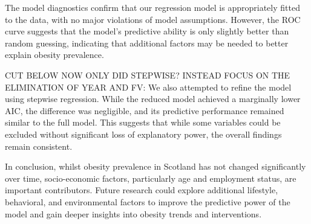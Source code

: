 \documentclass[
  letterpaper,
  DIV=11,
  numbers=noendperiod]{scrartcl}
\begin{document}
The model diagnostics confirm that our regression model is appropriately
fitted to the data, with no major violations of model assumptions.
However, the ROC curve suggests that the model's predictive ability is
only slightly better than random guessing, indicating that additional
factors may be needed to better explain obesity prevalence.

CUT BELOW NOW ONLY DID STEPWISE? INSTEAD FOCUS ON THE ELIMINATION OF
YEAR AND FV: We also attempted to refine the model using stepwise
regression. While the reduced model achieved a marginally lower AIC, the
difference was negligible, and its predictive performance remained
similar to the full model. This suggests that while some variables could
be excluded without significant loss of explanatory power, the overall
findings remain consistent.

In conclusion, whilst obesity prevalence in Scotland has not changed
significantly over time, socio-economic factors, particularly age and
employment status, are important contributors. Future research could
explore additional lifestyle, behavioral, and environmental factors to
improve the predictive power of the model and gain deeper insights into
obesity trends and interventions.
\end{document}
